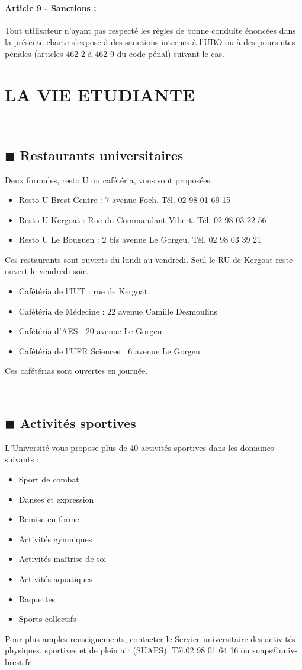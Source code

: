 \documentclass[11pt]{article}
\newcommand{\mysection}[1]
{
{
\setlength{\fboxsep}{0cm}
\noindent
\begin{minipage}{\linewidth}
\section{\large \textbf{#1}}
\vspace*{-10pt}
\end{minipage}\vspace*{10pt}
}
}
\newcommand{\mysubsection}[1]
{~\\
{\noindent
\begin{minipage}{\linewidth}
\subsection*{$\blacksquare$ #1}
\end{minipage}
}
}
\begin{document}
{{\begin{multicols*}{2}
\paragraph{Article 9 - Sanctions :}
Tout utilisateur n'ayant pas respecté les règles de bonne conduite énoncées dans la présente charte s'expose à des sanctions internes à l'UBO ou à des poursuites pénales (articles 462-2 à 462-9 du code pénal) suivant le cas.

\end{multicols*}

\renewcommand{\labelitemi}{-}
\mysection{LA VIE ETUDIANTE}
\vspace{-0.5cm}
\begin{multicols*}{2}
\raggedcolumns
\mysubsection{Restaurants universitaires}

Deux formules, resto U ou cafétéria, vous sont proposées.
\begin{itemize}
\item Resto U Brest Centre : 7 avenue Foch. Tél. 02 98 01 69 15
\item Resto U Kergoat : Rue du Commandant Vibert. Tél. 02 98 03 22 56
\item Resto U Le Bouguen : 2 bis avenue Le Gorgeu. Tél. 02 98 03 39 21
\end{itemize}
Ces restaurants sont ouverts du lundi au vendredi. Seul le RU de Kergoat reste ouvert le vendredi soir.\\
\begin{itemize}
\item Cafétéria de l'IUT : rue de Kergoat.
\item Cafétéria de Médecine : 22 avenue Camille Desmoulins
\item Cafétéria d'AES : 20 avenue Le Gorgeu
\item Cafétéria de l'UFR Sciences : 6 avenue Le Gorgeu\\
\end{itemize}
Ces cafétérias sont ouvertes en journée.

\mysubsection{Activités sportives}
L'Université vous propose plus de 40 activités sportives dans les domaines suivants :
\begin{itemize}
\item Sport de combat
\item Danses et expression
\item Remise en forme
\item Activités gymniques
\item Activités maîtrise de soi
\item Activités aquatiques
\item Raquettes
\item Sports collectifs
\end{itemize}
Pour plus amples renseignements, contacter le Service universitaire des activités physiques, sportives et de plein air (SUAPS). Tél.02 98 01 64 16 ou suaps@univ-brest.fr



\end{multicols*}}}
\end{document}
